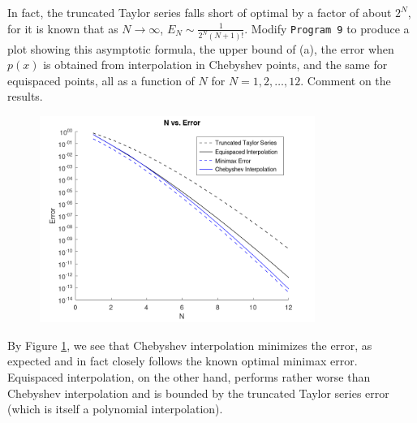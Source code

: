 In fact, the truncated Taylor series falls short of optimal by a factor of about $2^N$, for it is known that as 
$N \to \infty$, $E_N \sim \frac{1}{2^N (N+1)!}$. Modify \texttt{Program 9} to produce a plot showing this asymptotic 
formula, the upper bound of (a), the error when $p(x)$ is obtained from interpolation in Chebyshev points, and the same
for equispaced points, all as a function of $N$ for $N = 1, 2, \ldots, 12$. Comment on the results.

\begin{solution}
  \begin{figure}[h]
    \centering
    \includegraphics*[width=0.8\textwidth]{problem_1b.png}
    \caption{}
    \label{fig:interpolation_error_plots}
  \end{figure}

  By Figure \ref{fig:interpolation_error_plots}, we see that Chebyshev interpolation minimizes the error, as expected and in 
  fact closely follows the known optimal minimax error. Equispaced interpolation, on the other hand, performs rather 
  worse than Chebyshev interpolation and is bounded by the truncated Taylor series error (which is itself a polynomial 
  interpolation).
  \ \\
\end{solution}